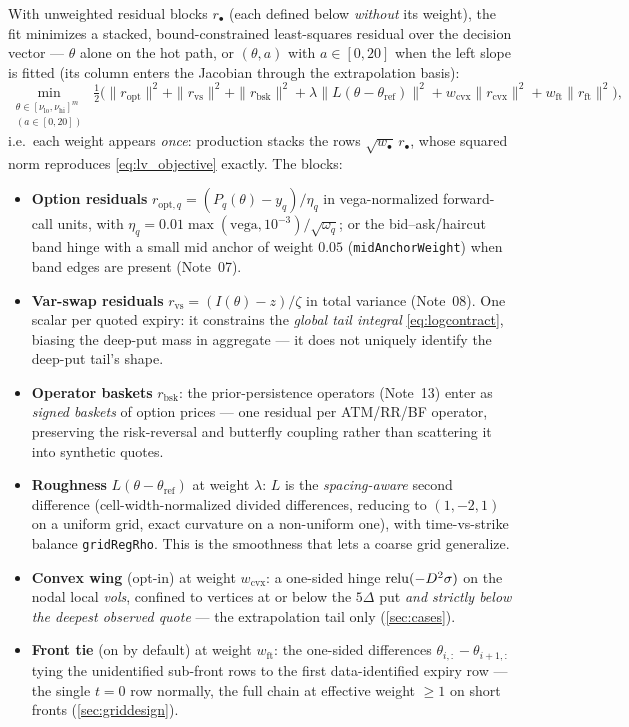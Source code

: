 \documentclass[11pt]{article}
\begin{document}
With unweighted residual blocks $r_\bullet$ (each defined below \emph{without}
its weight), the fit minimizes a stacked, bound-constrained least-squares
residual over the decision vector --- $\theta$ alone on the hot path, or
$(\theta,a)$ with $a\in[0,20]$ when the left slope is fitted (its column
enters the Jacobian through the extrapolation basis):
\begin{equation}
\min_{\substack{\theta\in[\nu_{\mathrm{lo}},\nu_{\mathrm{hi}}]^m\\ (a\in[0,20])}}
\ \tfrac12\Big(
\|r_{\text{opt}}\|^2+\|r_{\text{vs}}\|^2+\|r_{\text{bsk}}\|^2
+\lambda\|L(\theta-\theta_{\text{ref}})\|^2
+w_{\text{cvx}}\|r_{\text{cvx}}\|^2+w_{\text{ft}}\|r_{\text{ft}}\|^2\Big),
\label{eq:lv_objective}
\end{equation}
i.e.\ each weight appears \emph{once}: production stacks the rows
$\sqrt{w_\bullet}\,r_\bullet$, whose squared norm reproduces
\eqref{eq:lv_objective} exactly. The blocks:
\begin{itemize}[leftmargin=1.4em]
\item \textbf{Option residuals} $r_{\text{opt},q}=(P_q(\theta)-y_q)/\eta_q$ in
vega-normalized forward-call units, with
$\eta_q=0.01\max(\text{vega},10^{-3})/\sqrt{\omega_q}$; or the
bid--ask/haircut band hinge with a small mid anchor of weight $0.05$
(\texttt{midAnchorWeight}) when band edges are present (Note~07).
\item \textbf{Var-swap residuals} $r_{\text{vs}}=(I(\theta)-z)/\zeta$ in total
variance (Note~08). One scalar per quoted expiry: it constrains the
\emph{global tail integral} \eqref{eq:logcontract}, biasing the deep-put mass
in aggregate --- it does not uniquely identify the deep-put tail's shape.
\item \textbf{Operator baskets} $r_{\text{bsk}}$: the prior-persistence
operators (Note~13) enter as \emph{signed baskets} of option prices --- one
residual per ATM/RR/BF operator, preserving the risk-reversal and butterfly
coupling rather than scattering it into synthetic quotes.
\item \textbf{Roughness} $L(\theta-\theta_{\text{ref}})$ at weight $\lambda$:
$L$ is the \emph{spacing-aware} second difference (cell-width-normalized
divided differences, reducing to $(1,-2,1)$ on a uniform grid, exact
curvature on a non-uniform one), with time-vs-strike balance
\texttt{gridRegRho}. This is the smoothness that lets a coarse grid
generalize.
\item \textbf{Convex wing} (opt-in) at weight $w_{\text{cvx}}$: a one-sided
hinge $\operatorname{relu}(-D^2\sigma)$ on the nodal local \emph{vols}, confined to
vertices at or below the $5\Delta$ put \emph{and strictly below the deepest
observed quote} --- the extrapolation tail only (\cref{sec:cases}).
\item \textbf{Front tie} (on by default) at weight $w_{\text{ft}}$: the
one-sided differences $\theta_{i,:}-\theta_{i+1,:}$ tying the unidentified
sub-front rows to the first data-identified expiry row --- the single $t=0$
row normally, the full chain at effective weight $\ge1$ on short fronts
(\cref{sec:griddesign}).
\end{itemize}
\end{document}
